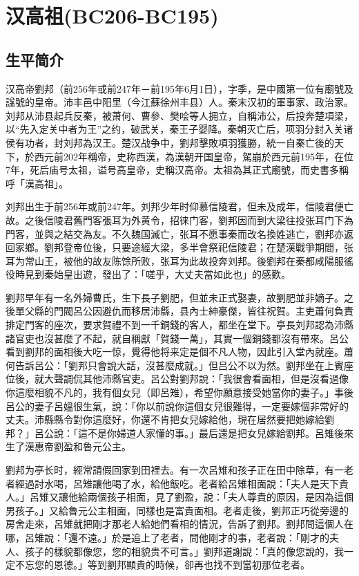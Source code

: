 
\section{汉高祖\tiny(BC206-BC195)}

\subsection{生平简介}


汉高帝劉邦（前256年或前247年－前195年6月1日），字季，是中國第一位有廟號及諡號的皇帝。沛丰邑中阳里（今江蘇徐州丰县）人。秦末汉初的軍事家、政治家。刘邦从沛县起兵反秦，被萧何、曹參、樊哙等人拥立，自稱沛公，后投奔楚項梁，以“先入定关中者为王”之约，破武关，秦王子婴降。秦朝灭亡后，项羽分封入关诸侯有功者，封刘邦為汉王。楚汉战争中，劉邦擊敗項羽獲勝，統一自秦亡後的天下，於西元前202年稱帝，史称西漢，為漢朝开国皇帝，駕崩於西元前195年，在位7年，死后庙号太祖，谥号高皇帝，史稱汉高帝。太祖為其正式廟號，而史書多稱呼「漢高祖」。

刘邦出生于前256年或前247年。刘邦少年时仰慕信陵君，但未及成年，信陵君便亡故。之後信陵君舊門客張耳为外黄令，招徕门客，劉邦因而到大梁往投张耳门下為門客，並與之結交為友。不久魏国滅亡，张耳不愿事秦而改名換姓逃亡，劉邦亦返回家鄉。劉邦登帝位後，只要途經大梁，多半會祭祀信陵君；在楚漢戰爭期間，张耳为常山王，被他的故友陈馀所败，张耳为此故投奔刘邦。後劉邦在秦都咸陽服徭役時見到秦始皇出遊，發出了：「嗟乎，大丈夫當如此也」的感歎。

劉邦早年有一名外婦曹氏，生下長子劉肥，但並未正式娶妻，故劉肥並非嫡子。之後單父縣的門閥呂公因避仇而移居沛縣，县內士紳豪傑，皆往祝賀。主吏蕭何負責排定門客的座次，要求賀禮不到一千銅錢的客人，都坐在堂下。亭長刘邦認為沛縣諸官吏也沒甚麼了不起，就自稱獻「賀錢一萬」，其實一個銅錢都沒有帶來。呂公看到劉邦的面相後大吃一惊，覺得他将来定是個不凡人物，因此引入堂內就座。蕭何告訴呂公：「劉邦只會說大話，沒甚麼成就。」但吕公不以为然。劉邦坐在上賓座位後，就大聲調侃其他沛縣官吏。呂公對劉邦說：「我很會看面相，但是沒看過像你這麼相貌不凡的，我有個女兒（即呂雉），希望你願意接受她當你的妻子。」事後呂公的妻子呂媼很生氣，說：「你以前說你這個女兒很難得，一定要嫁個非常好的丈夫。沛縣縣令對你這麼好，你還不肯把女兒嫁給他，現在居然要把她嫁給劉邦？」呂公說：「這不是你婦道人家懂的事。」最后還是把女兒嫁給劉邦。呂雉後來生了漢惠帝劉盈和魯元公主。

劉邦为亭长时，經常請假回家到田裡去。有一次呂雉和孩子正在田中除草，有一老者經過討水喝，呂雉讓他喝了水，給他飯吃。老者給呂雉相面說：「夫人是天下貴人。」呂雉又讓他給兩個孩子相面，見了劉盈，說：「夫人尊貴的原因，是因為這個男孩子。」又給魯元公主相面，同樣也是富貴面相。老者走後，劉邦正巧從旁邊的房舍走來，呂雉就把剛才那老人給她們看相的情況，告訴了劉邦。劉邦問這個人在哪，呂雉說：「還不遠。」於是追上了老者，問他剛才的事，老者說：「剛才的夫人、孩子的樣貌都像您，您的相貌贵不可言。」劉邦道謝說：「真的像您說的，我一定不忘您的恩德。」等到劉邦顯貴的時候，卻再也找不到當初那位老者。

